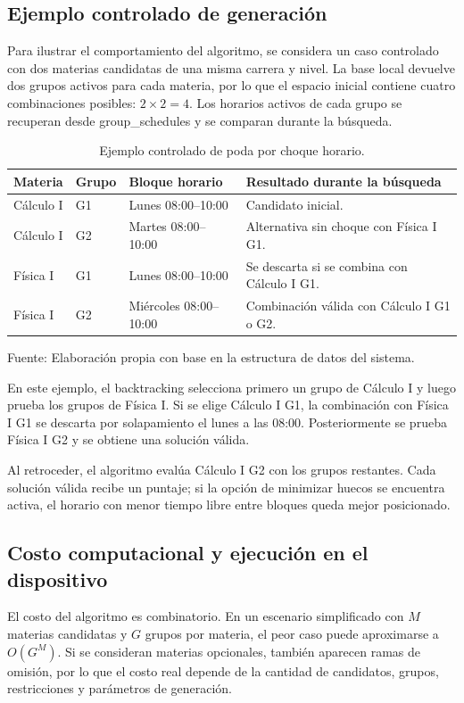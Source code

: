 \subsection{Ejemplo controlado de generación}
Para ilustrar el comportamiento del algoritmo, se considera un caso controlado con dos materias candidatas de una misma carrera y nivel. La base local devuelve dos grupos activos para cada materia, por lo que el espacio inicial contiene cuatro combinaciones posibles: \(2 \times 2 = 4\). Los horarios activos de cada grupo se recuperan desde group\_schedules y se comparan durante la búsqueda.

\begin{table}[H]
\centering
\begin{tabularx}{\linewidth}{p{3cm} p{3cm} p{3.5cm} p{4cm}}
\toprule
Materia & Grupo & Bloque horario & Resultado durante la búsqueda \\
\midrule
Cálculo I & G1 & Lunes 08:00--10:00 & Candidato inicial. \\
Cálculo I & G2 & Martes 08:00--10:00 & Alternativa sin choque con Física I G1. \\
Física I & G1 & Lunes 08:00--10:00 & Se descarta si se combina con Cálculo I G1. \\
Física I & G2 & Miércoles 08:00--10:00 & Combinación válida con Cálculo I G1 o G2. \\
\bottomrule
\end{tabularx}
\caption{Ejemplo controlado de poda por choque horario.}\label{tab:f3_ejemplo_controlado}
  Fuente: Elaboración propia con base en la estructura de datos del sistema.
\end{table}

En este ejemplo, el backtracking selecciona primero un grupo de Cálculo I y luego prueba los grupos de Física I. Si se elige Cálculo I G1, la combinación con Física I G1 se descarta por solapamiento el lunes a las 08:00. Posteriormente se prueba Física I G2 y se obtiene una solución válida.

Al retroceder, el algoritmo evalúa Cálculo I G2 con los grupos restantes. Cada solución válida recibe un puntaje; si la opción de minimizar huecos se encuentra activa, el horario con menor tiempo libre entre bloques queda mejor posicionado.

\subsection{Costo computacional y ejecución en el dispositivo}
El costo del algoritmo es combinatorio. En un escenario simplificado con \(M\) materias candidatas y \(G\) grupos por materia, el peor caso puede aproximarse a \(O(G^M)\). Si se consideran materias opcionales, también aparecen ramas de omisión, por lo que el costo real depende de la cantidad de candidatos, grupos, restricciones y parámetros de generación.

